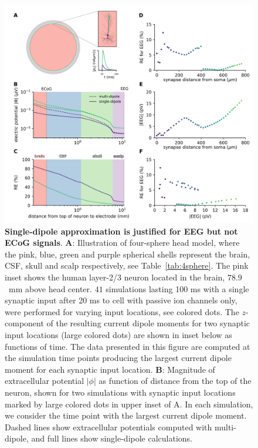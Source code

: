\documentclass[preprint,10pt,authoryear]{elsarticle}
\newcommand{\hlp}[2][Purple]{ {\sethlcolor{#1} \hl{#2}} }
\newcommand{\sntxt}[1]{{\color{NavyBlue}#1}}
\newcommand{\gen}[1]{\color{white}{\hlp{GTE: #1 }}\color{black}}
\begin{document}
\begin{figure}[H]
	\centering
	\includegraphics[width=1.0\textwidth]{figure2_eeg.png}
	\caption{\textbf{Single-dipole approximation is justified for EEG but not ECoG signals}. 
		\textbf{A}: Illustration of four-sphere head model, where the pink, blue, green and purple spherical shells represent the brain, CSF, skull and scalp respectively, see Table~\ref{tab:4sphere}. The pink inset shows the human layer-2/3 neuron \citep{EYAL2016} \sntxt{located in the brain, $78.9$~\si{mm} above head center}. $41$ simulations lasting 100 ms with a single synaptic input after 20 ms to cell with passive ion channels only, were performed for varying input locations, see colored dots. %
		The $z$-component of the resulting current dipole moments for two synaptic input locations (large colored dots) are shown in inset below as functions of time. The data presented in this figure are computed at the simulation time points producing the largest current dipole moment for each synaptic input location.
		\textbf{B}: Magnitude of extracellular potential $|\phi|$ as function of distance from the top of the neuron, shown for two simulations with synaptic input locations marked by large colored dots in upper inset of A. In each simulation, we consider the time point with the largest current dipole moment. Dashed lines show extracellular potentials computed with multi-dipole, and full lines show single-dipole calculations.
}
\end{figure}
\end{document}
